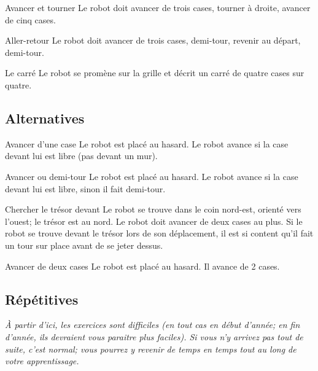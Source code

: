 \begin{Exercice}{Avancer et tourner}
	Le robot doit avancer de trois cases, tourner à droite, 
	avancer de cinq cases.
\end{Exercice}

\begin{Exercice}{Aller-retour}
	Le robot doit avancer de trois cases, demi-tour, 
	revenir au départ, demi-tour.
\end{Exercice}

\begin{Exercice}{Le carré}
	Le robot se promène sur la grille 
	et décrit un carré de quatre cases sur quatre.
\end{Exercice}
		
	\subsection{Alternatives}

\begin{Exercice}{Avancer d'une case}
	Le robot est placé au hasard.
	Le robot avance si la case devant lui est libre (pas devant un mur).
\end{Exercice}

\begin{Exercice}{Avancer ou demi-tour}
	Le robot est placé au hasard. 
	Le robot avance si la case devant lui est libre,
	sinon il fait demi-tour.
\end{Exercice}

\begin{Exercice}{Chercher le trésor devant}
	Le robot se trouve dans le coin nord-est, orienté vers
	l'ouest; le trésor est au nord. Le robot doit avancer
	de deux cases au plus. Si le robot se trouve devant le trésor lors de
	son déplacement, il est si content qu'il fait un tour
	sur place avant de se jeter dessus.
\end{Exercice}

\begin{Exercice}{Avancer de deux cases}
	Le robot est placé au hasard. Il avance de 2 cases.
\end{Exercice}


	\subsection{Répétitives}

		\emph{%
		À partir d'ici, les exercices sont difficiles
		(en tout cas en début d'année; en fin d'année,
		ils devraient vous paraitre plus faciles).
		Si vous n'y arrivez pas tout de suite, c'est normal; 
		vous pourrez y revenir de temps en temps 
		tout au long de votre apprentissage.
		}

